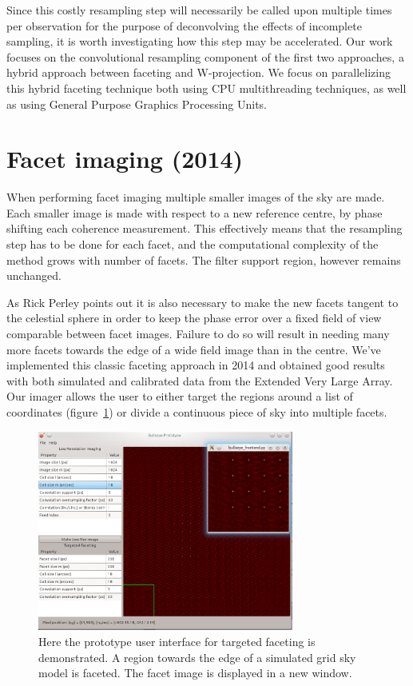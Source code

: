 \documentclass[a4paper,10pt]{article}
\begin{document}
Since this costly resampling step will necessarily be called upon multiple times per observation for the purpose of deconvolving the 
effects of incomplete sampling, it is worth investigating how this step may be accelerated. Our work focuses on the convolutional 
resampling component of the first two approaches, a hybrid approach between faceting and W-projection. We focus on parallelizing
this hybrid faceting technique both using CPU multithreading techniques, as well as using General Purpose Graphics 
Processing Units.
\section{Facet imaging (2014)}
When performing facet imaging multiple smaller images of the sky are made. Each smaller image is made with respect to a new reference
centre, by phase shifting each coherence measurement. This effectively means that the resampling step has to be done for each
facet, and the computational complexity of the method grows with number of facets. The filter support region, however remains unchanged.

As Rick Perley \cite{perley1999imaging} points out it is also necessary to make the new facets tangent to the celestial sphere in order 
to keep the phase error over a fixed field of view comparable between facet images. Failure to do so will result in needing many
more facets towards the edge of a wide field image than in the centre. We've implemented this classic faceting approach in 2014 and obtained
good results with both simulated and calibrated data from the Extended Very Large Array. Our imager allows the user to either target the 
regions around a list of coordinates (figure~\ref{FIG_BULLSEYE}) or divide a continuous piece of sky into multiple facets.

\begin{figure}[h!]
 \centering
 \includegraphics[width=0.75\textwidth]{images/targeted_faceting.png}
 \caption[Targeted faceting]{Here the prototype user interface for targeted faceting is demonstrated. A region towards the edge
 of a simulated grid sky model is faceted. The facet image is displayed in a new window.}
 \label{FIG_BULLSEYE}
\end{figure}
\end{document}
